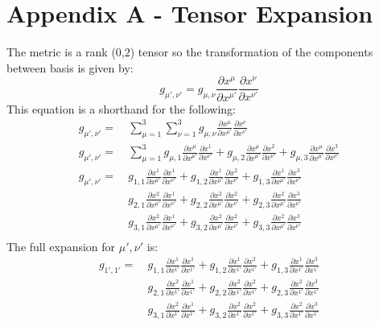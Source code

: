 \documentclass[9pt]{report}
\begin{document}
\section{Appendix A - Tensor Expansion}
  The metric is a rank ($0$,$2$) tensor so the transformation of the components
  between basis is given by:
  \[
      g_{\mu', \nu'} = g_{\mu, \nu} \frac{\partial x^\mu}{\partial x^{\mu'}}\frac{\partial x^\nu}{\partial x^{\nu'}}
  \]
  This equation is a shorthand for the following:
    \[
    \begin{align*}
    g_{\mu', \nu'} =&\ \sum_{\mu=1}^{3} \sum_{\nu=1}^{3} g_{\mu, \nu} \frac{\partial x^\mu}{\partial x^{\mu'}}
    \frac{\partial x^\nu}{\partial x^{\nu'}} \\
    g_{\mu', \nu'} =&\ \sum_{\mu=1}^{3}
     g_{\mu, 1}\frac{\partial x^\mu}{\partial x^{\mu'}}\frac{\partial x^1}{\partial x^{\nu'}}
    +g_{\mu, 2}\frac{\partial x^\mu}{\partial x^{\mu'}}\frac{\partial x^2}{\partial x^{\nu'}}
    +g_{\mu, 3}\frac{\partial x^\mu}{\partial x^{\mu'}} \frac{\partial x^3}{\partial x^{\nu'}}\\
    g_{\mu', \nu'} =&\
     g_{1,1}\frac{\partial x^1}{\partial x^{\mu'}}\frac{\partial x^1}{\partial x^{\nu'}}
    +g_{1,2}\frac{\partial x^1}{\partial x^{\mu'}}\frac{\partial x^2}{\partial x^{\nu'}}
    +g_{1,3}\frac{\partial x^1}{\partial x^{\mu'}}\frac{\partial x^3}{\partial x^{\nu'}}\\
    &\ g_{2,1}\frac{\partial x^2}{\partial x^{\mu'}}\frac{\partial x^1}{\partial x^{\nu'}}
    +g_{2,2}\frac{\partial x^2}{\partial x^{\mu'}}\frac{\partial x^2}{\partial x^{\nu'}}
    +g_{2,3}\frac{\partial x^2}{\partial x^{\mu'}}\frac{\partial x^3}{\partial x^{\nu'}}\\
    &\
     g_{3,1}\frac{\partial x^2}{\partial x^{\mu'}}\frac{\partial x^1}{\partial x^{\nu'}}
    +g_{3,2}\frac{\partial x^2}{\partial x^{\mu'}}\frac{\partial x^2}{\partial x^{\nu'}}
    +g_{3,3}\frac{\partial x^2}{\partial x^{\mu'}}\frac{\partial x^3}{\partial x^{\nu'}}\\
    \end{align*}
  \]
  The full expansion for $\mu', \nu'$ is:
  \[
    \begin{align*}
    g_{1', 1'} =\
     &g_{1,1}\frac{\partial x^1}{\partial x^{1'}}\frac{\partial x^1}{\partial x^{1'}}
    +g_{1,2}\frac{\partial x^1}{\partial x^{1'}}\frac{\partial x^2}{\partial x^{1'}}
    +g_{1,3}\frac{\partial x^1}{\partial x^{1'}}\frac{\partial x^3}{\partial x^{1'}}\\
    &
     g_{2,1}\frac{\partial x^2}{\partial x^{1'}}\frac{\partial x^1}{\partial x^{1'}}
    +g_{2,2}\frac{\partial x^2}{\partial x^{1'}}\frac{\partial x^2}{\partial x^{1'}}
    +g_{2,3}\frac{\partial x^2}{\partial x^{1'}}\frac{\partial x^3}{\partial x^{1'}}\\
    &
     g_{3,1}\frac{\partial x^2}{\partial x^{1'}}\frac{\partial x^1}{\partial x^{1'}}
    +g_{3,2}\frac{\partial x^2}{\partial x^{1'}}\frac{\partial x^2}{\partial x^{1'}}
    +g_{3,3}\frac{\partial x^2}{\partial x^{1'}}\frac{\partial x^3}{\partial x^{1'}}\\
    \end{align*}
  \]
\end{document}

